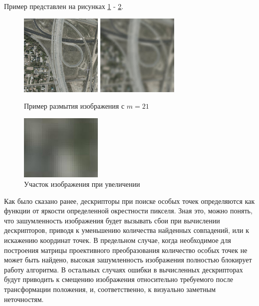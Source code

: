 {	Пример представлен на рисунках \ref{noises blur} - \ref{noises blur big}.
	\begin{figure}[H]
		\centering                             
		\includegraphics[width=0.35\textwidth,keepaspectratio]{noises/original.jpg}   
		\includegraphics[width=0.35\textwidth,keepaspectratio]{noises/blur.jpg}                 
		\centering\caption{ Пример размытия изображения с $m=21$ }
		\label{noises blur}                           
	\end{figure}    
		\begin{figure}[H]
		\centering                             
		\includegraphics[width=0.35\textwidth,keepaspectratio]{noises/blur_big.jpg}                   
		\centering\caption{ Участок изображения при увеличении }
		\label{noises blur big}                           
	\end{figure}    

	Как было сказано ранее, дескрипторы при поиске особых точек определяются как функции от яркости определенной окрестности пикселя. Зная это, можно понять, что зашумленность изображения будет вызывать сбои при вычислении дескрипторов, приводя к уменьшению количества найденных совпадений, или к искажению координат точек. В предельном случае, когда необходимое для построения матрицы проективного преобразования количество особых точек не может быть найдено, высокая зашумленность изображения полностью блокирует работу алгоритма. В остальных случаях ошибки в вычисленных дескрипторах будут приводить к смещению изображения относительно требуемого после трансформации положения, и, соответственно, к визуально заметным неточностям.
}
\newpage

